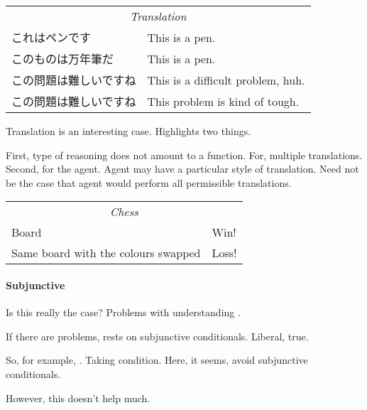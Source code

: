 \begin{note}
  \begin{center}
    \begin{tabular}[h]{p{.55\linewidth}|p{.4\linewidth}}
      \multicolumn{2}{c}{\emph{Translation}} \\
      これはペンです & This is a pen. \\
      このものは万年筆だ & This is a pen. \\
      この問題は難しいですね & This is a difficult problem, huh. \\
      この問題は難しいですね & This problem is kind of tough. \\
    \end{tabular}
  \end{center}

  Translation is an interesting case.
  Highlights two things.

  First, type of reasoning does not amount to a function.
  For, multiple translations.
  Second, for the agent.
  Agent may have a particular style of translation.
  Need not be the case that agent would perform all permissible translations.
\end{note}

\begin{note}
  \begin{center}
    \begin{tabular}[h]{p{.55\linewidth}|p{.4\linewidth}}
      \multicolumn{2}{c}{\emph{Chess}} \\
      Board & Win! \\
      Same board with the colours swapped & Loss! \\
    \end{tabular}
  \end{center}
\end{note}

\paragraph{Subjunctive}

\begin{note}
  Is this really the case?
  Problems with understanding \sR{}.

  If there are problems, rests on subjunctive conditionals.
  Liberal, true.

  So, for example, \citeauthor{Boghossian:2014aa}.
  Taking condition.
  Here, it seems, avoid subjunctive conditionals.

  However, this doesn't help much.
\end{note}

